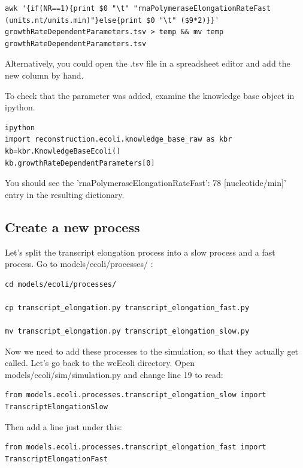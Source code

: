 \documentclass[12pt]{article}
\begin{document}
\pagebreak

\begin{lstlisting}
awk '{if(NR==1){print $0 "\t" "rnaPolymeraseElongationRateFast (units.nt/units.min)"}else{print $0 "\t" ($9*2)}}' growthRateDependentParameters.tsv > temp && mv temp growthRateDependentParameters.tsv  
\end{lstlisting}

Alternatively, you could open the .tsv file in a spreadsheet editor and add the new column by hand.

To check that the parameter was added, examine the knowledge base object in ipython.

\lstset{language=Python}
\begin{lstlisting}
ipython
import reconstruction.ecoli.knowledge_base_raw as kbr
kb=kbr.KnowledgeBaseEcoli()
kb.growthRateDependentParameters[0]
\end{lstlisting}

You should see the 'rnaPolymeraseElongationRateFast': 78 [nucleotide/min]' entry in the resulting dictionary.

\subsection{Create a new process}

Let’s split the transcript elongation process into a slow process and a fast process. Go to models/ecoli/processes/ :

\lstset{language=bash}
\begin{lstlisting}
cd models/ecoli/processes/

cp transcript_elongation.py transcript_elongation_fast.py

mv transcript_elongation.py transcript_elongation_slow.py
\end{lstlisting}

Now we need to add these processes to the simulation, so that they actually get called. Let’s go back to the wcEcoli directory. Open models/ecoli/sim/simulation.py and change line 19 to read: 

\lstset{language=Python}
\begin{lstlisting}
from models.ecoli.processes.transcript_elongation_slow import TranscriptElongationSlow
\end{lstlisting}

Then add a line just under this:

\begin{lstlisting}
from models.ecoli.processes.transcript_elongation_fast import TranscriptElongationFast
\end{lstlisting}
\end{document}
